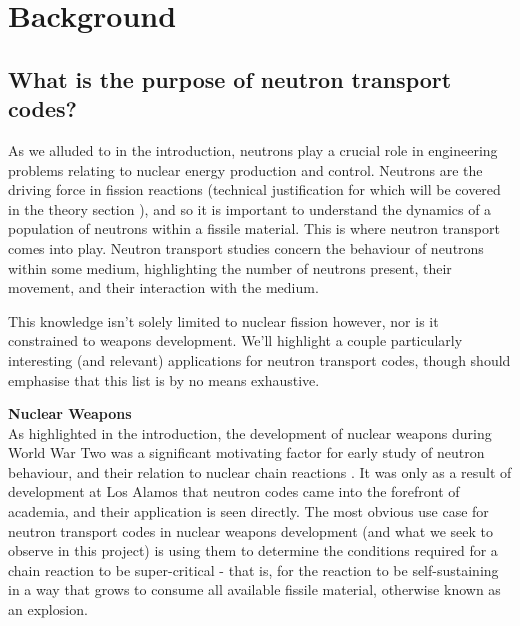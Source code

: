 

\section{Background}

\subsection{What is the purpose of neutron transport codes?}

As we alluded to in the introduction, neutrons play a crucial role in engineering problems relating to nuclear energy production 
and control. Neutrons are the driving force in fission reactions (technical justification for which will be covered in the theory section 
), and so it is important to understand the dynamics of a population of neutrons within a fissile material. This is where neutron transport comes into play. 
Neutron transport studies concern the behaviour of neutrons within some medium, highlighting the number of neutrons present, their movement, 
and their interaction with the medium. 

This knowledge isn't solely limited to nuclear fission however, nor is it constrained to weapons development.
We'll highlight a couple particularly interesting (and relevant) applications for neutron transport codes, though should emphasise 
that this list is by no means exhaustive.

\noindent\textbf{Nuclear Weapons}\\
As highlighted in the introduction, the development of nuclear weapons during World War Two was a significant motivating 
factor for early study of neutron behaviour, and their relation to nuclear chain reactions \cite{los-alamos-primer}. 
It was only as a result of development at Los Alamos that neutron codes came into the forefront of academia, and their 
application is seen directly. The most obvious use case for neutron transport codes in nuclear weapons development 
(and what we seek to observe in this project) is using them to determine the conditions required for a 
chain reaction to be super-critical - that is, for the reaction to be self-sustaining in a way that grows to consume 
all available fissile material, otherwise known as an explosion.

